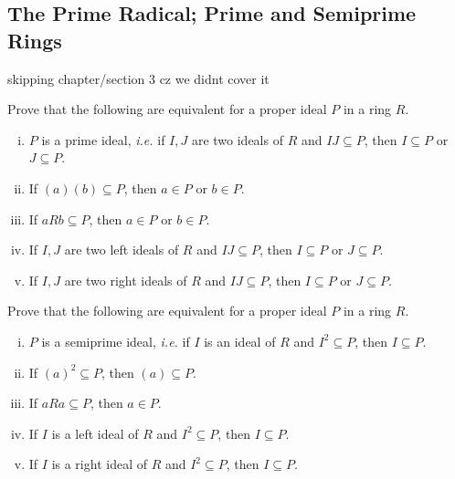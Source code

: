\subsection{The Prime Radical; Prime and Semiprime Rings}
\setcounter{subsection}{1}
skipping chapter/section 3 cz we didnt cover it

\begin{exr}[title=Proposition 10.2] %
	Prove that the following are equivalent for
	a proper ideal $P$ in a ring $R$. \vspace{-0.2in}
	\begin{enumerate}[i)]
		\item $P$ is a prime ideal, \textit{i.e.} if $I,J$ are two ideals of $R$ and
			$IJ\subseteq P$, then $I\subseteq P$ or $J\subseteq P$.
		\item If $(a)(b)\subseteq P$, then $a\in P$ or $b\in P$.
		\item If $aRb\subseteq P$, then $a\in P$ or $b\in P$.
		\item If $I,J$ are two left ideals of $R$ and $IJ\subseteq P$,
			then $I\subseteq P$ or $J\subseteq P$.
		\item If $I,J$ are two right ideals of $R$ and $IJ\subseteq P$,
			then $I\subseteq P$ or $J\subseteq P$.
	\end{enumerate}
\end{exr}


\nq
\begin{exr}[title=Proposition 10.9] %
	Prove that the following are equivalent for
	a proper ideal $P$ in a ring $R$. \vspace{-0.2in}
	\begin{enumerate}[i)]
		\item $P$ is a semiprime ideal, \textit{i.e.} if $I$ is an ideal of $R$ and
			$I^2\subseteq P$, then $I\subseteq P$.
		\item If $(a)^2\subseteq P$, then $(a)\subseteq P$.
		\item If $aRa\subseteq P$, then $a\in P$.
		\item If $I$ is a left ideal of $R$ and $I^2\subseteq P$,
			then $I\subseteq P$.
		\item If $I$ is a right ideal of $R$ and $I^2\subseteq P$,
			then $I\subseteq P$.
	\end{enumerate}
\end{exr}


